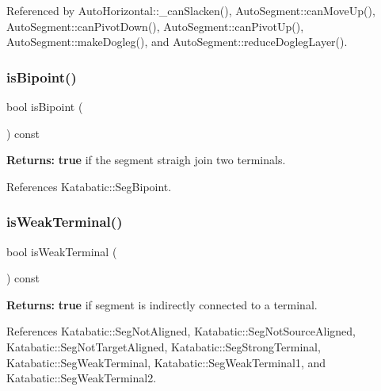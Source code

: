 Referenced by Auto\+Horizontal\+::\+\_\+can\+Slacken(), Auto\+Segment\+::can\+Move\+Up(), Auto\+Segment\+::can\+Pivot\+Down(), Auto\+Segment\+::can\+Pivot\+Up(), Auto\+Segment\+::make\+Dogleg(), and Auto\+Segment\+::reduce\+Dogleg\+Layer().

\mbox{\label{classKatabatic_1_1AutoSegment_a72741158d19af38e84c5e9c08f91270f}} 
\subsubsection{\texorpdfstring{is\+Bipoint()}{isBipoint()}}
{\footnotesize\ttfamily bool is\+Bipoint (\begin{DoxyParamCaption}{ }\end{DoxyParamCaption}) const\hspace{0.3cm}{\ttfamily [inline]}}

{\bfseries Returns\+:} {\bfseries true} if the segment straigh join two terminals. 

References Katabatic\+::\+Seg\+Bipoint.

\mbox{\label{classKatabatic_1_1AutoSegment_aef3a61d223be84ac336c4f7bc64884ba}} 
\subsubsection{\texorpdfstring{is\+Weak\+Terminal()}{isWeakTerminal()}}
{\footnotesize\ttfamily bool is\+Weak\+Terminal (\begin{DoxyParamCaption}{ }\end{DoxyParamCaption}) const\hspace{0.3cm}{\ttfamily [inline]}}

{\bfseries Returns\+:} {\bfseries true} if segment is indirectly connected to a terminal. 

References Katabatic\+::\+Seg\+Not\+Aligned, Katabatic\+::\+Seg\+Not\+Source\+Aligned, Katabatic\+::\+Seg\+Not\+Target\+Aligned, Katabatic\+::\+Seg\+Strong\+Terminal, Katabatic\+::\+Seg\+Weak\+Terminal, Katabatic\+::\+Seg\+Weak\+Terminal1, and Katabatic\+::\+Seg\+Weak\+Terminal2.



